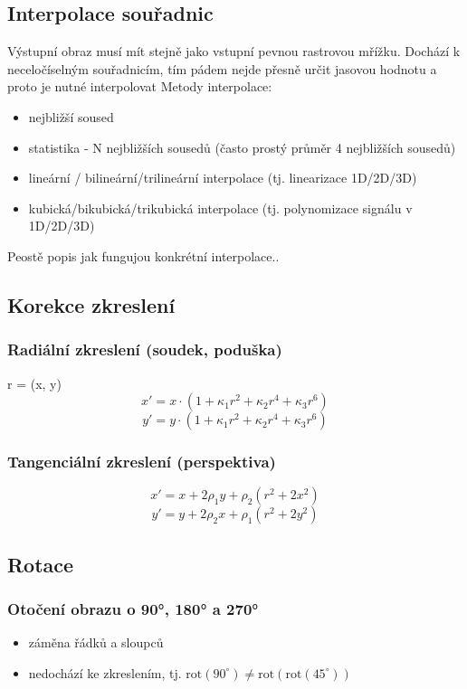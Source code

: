 \subsection{Interpolace souřadnic}
Výstupní obraz musí mít stejně jako vstupní pevnou rastrovou mřížku. Dochází k neceločíselným souřadnicím, tím pádem nejde přesně určit jasovou hodnotu a proto je nutné interpolovat
Metody interpolace:
\begin{itemize}
    \item nejbližší soused
    \item statistika - N nejbližších sousedů (často prostý průměr 4 nejbližších sousedů)
    \item lineární / bilineární/trilineární interpolace (tj. linearizace 1D/2D/3D)
    \item kubická/bikubická/trikubická interpolace (tj. polynomizace signálu v 1D/2D/3D)
\end{itemize}
Peostě popis jak fungujou konkrétní interpolace..
\subsection{Korekce zkreslení}



\subsubsection{Radiální zkreslení (soudek, poduška)}
r =  (x, y) 
\[
x' = x \cdot \left( 1 + \kappa_1 r^2 + \kappa_2 r^4 + \kappa_3 r^6 \right)
\]
\[
y' = y \cdot \left( 1 + \kappa_1 r^2 + \kappa_2 r^4 + \kappa_3 r^6 \right)
\]
\subsubsection*{Tangenciální zkreslení (perspektiva)}
\[
x' = x + 2\rho_1 y + \rho_2 (r^2 + 2x^2)
\]
\[
y' = y + 2\rho_2 x + \rho_1 (r^2 + 2y^2)
\]


\subsection{Rotace}

\subsubsection*{Otočení obrazu o 90°, 180° a 270°}
\begin{itemize}
    \item záměna řádků a sloupců
    \item nedochází ke zkreslením, tj. $\mathrm{rot}(90^\circ) \neq \mathrm{rot}(\mathrm{rot}(45^\circ))$
\end{itemize}

